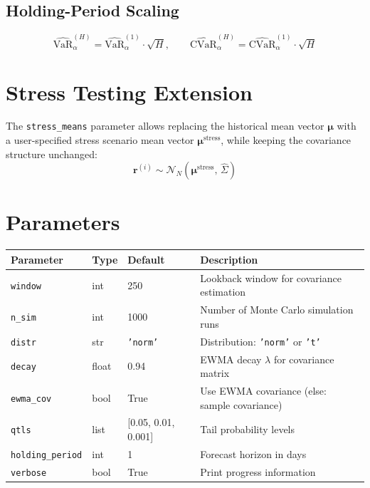 \documentclass[11pt, a4paper]{article}
\begin{document}
\subsection{Holding-Period Scaling}

\begin{equation}
\widehat{\text{VaR}}_\alpha^{(H)} = \widehat{\text{VaR}}_\alpha^{(1)} \cdot \sqrt{H},
\qquad
\widehat{\text{CVaR}}_\alpha^{(H)} = \widehat{\text{CVaR}}_\alpha^{(1)} \cdot \sqrt{H}
\end{equation}

\section{Stress Testing Extension}

The \texttt{stress\_means} parameter allows replacing the historical mean
vector $\boldsymbol{\mu}$ with a user-specified stress scenario mean vector
$\boldsymbol{\mu}^{\text{stress}}$, while keeping the covariance structure
unchanged:
\begin{equation}
\mathbf{r}^{(i)} \sim \mathcal{N}_N\!\left(\boldsymbol{\mu}^{\text{stress}},\, \hat{\Sigma}\right)
\end{equation}

\section{Parameters}

\begin{tabular}{llll}
\toprule
Parameter & Type & Default & Description \\
\midrule
\texttt{window}  & int   & 250   & Lookback window for covariance estimation \\
\texttt{n\_sim}  & int   & 1000  & Number of Monte Carlo simulation runs \\
\texttt{distr}   & str   & \texttt{'norm'} & Distribution: \texttt{'norm'} or \texttt{'t'} \\
\texttt{decay}   & float & 0.94  & EWMA decay $\lambda$ for covariance matrix \\
\texttt{ewma\_cov} & bool & True & Use EWMA covariance (else: sample covariance) \\
\texttt{qtls}    & list  & [0.05, 0.01, 0.001] & Tail probability levels \\
\texttt{holding\_period} & int & 1 & Forecast horizon in days \\
\texttt{verbose} & bool  & True  & Print progress information \\
\bottomrule
\end{tabular}
\end{document}
